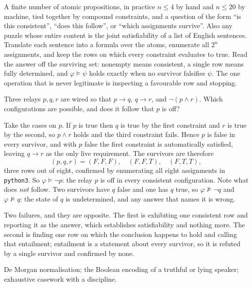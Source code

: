 \cue A finite number of atomic propositions, in practice $n\leq4$ by hand and $n\leq20$ by machine, tied together by compound constraints, and a question of the form ``is this consistent'', ``does this follow'', or ``which assignments survive''. Also any puzzle whose entire content is the joint satisfiability of a list of English sentences.
\method Translate each sentence into a formula over the atoms, enumerate all $2^n$ assignments, and keep the rows on which every constraint evaluates to true. Read the answer off the surviving set: nonempty means consistent, a single row means fully determined, and $\varphi\models\psi$ holds exactly when no survivor falsifies $\psi$. The one operation that is never legitimate is inspecting a favourable row and stopping.

\begin{worked}
Three relays $p,q,r$ are wired so that $p\to q$, $q\to r$, and $\lnot(p\wedge r)$. Which configurations are possible, and does it follow that $p$ is off?

Take the cases on $p$. If $p$ is true then $q$ is true by the first constraint and $r$ is true by the second, so $p\wedge r$ holds and the third constraint fails. Hence $p$ is false in every survivor, and with $p$ false the first constraint is automatically satisfied, leaving $q\to r$ as the only live requirement. The survivors are therefore
\[(p,q,r)=(F,F,F),\quad (F,F,T),\quad (F,T,T),\]
three rows out of eight, confirmed by enumerating all eight assignments in \texttt{python3}. So $\varphi\models\lnot p$: the relay $p$ is off in every consistent configuration. Note what does \emph{not} follow. Two survivors have $q$ false and one has $q$ true, so $\varphi\not\models\lnot q$ and $\varphi\not\models q$: the state of $q$ is undetermined, and any answer that names it is wrong.
\end{worked}

\begin{trap}
Two failures, and they are opposite. The first is exhibiting one consistent row and reporting it as the answer, which establishes satisfiability and nothing more. The second is finding one row on which the conclusion happens to hold and calling that entailment; entailment is a statement about every survivor, so it is refuted by a single survivor and confirmed by none.
\end{trap}

\begin{seealsob}De Morgan normalisation; the Boolean encoding of a truthful or lying speaker; exhaustive casework with a discipline.\end{seealsob}

